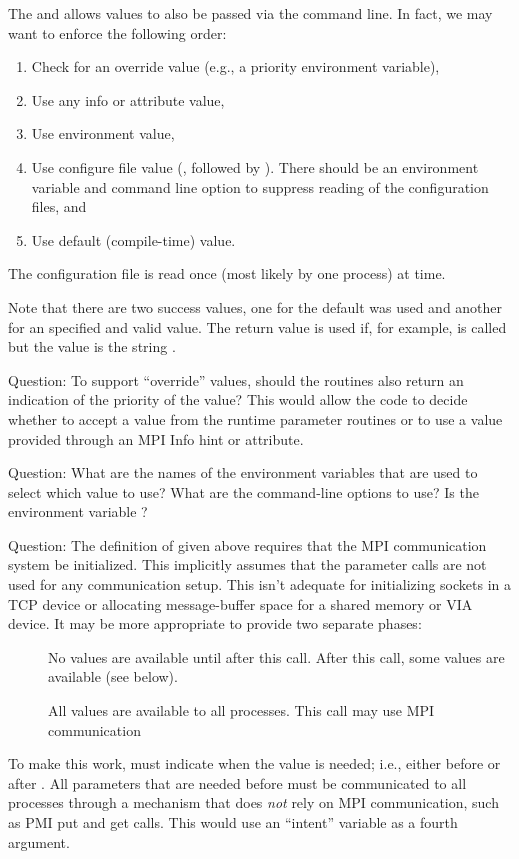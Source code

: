 \documentclass{article}
\begin{document}
The  and  allows
values to also be passed via the command line.  
In fact, we may want to enforce the following order:
\begin{enumerate}
\item Check for an override value (e.g., a priority environment variable),
\item Use any info or attribute value,
\item Use environment value,
\item Use configure file value (, followed by
  ).  There should be an environment variable and command
  line option to suppress reading of the configuration files, and
\item Use default (compile-time) value.
\end{enumerate}
The configuration file is read once (most likely by one process) at
 time.  

Note that there are two success values, one for the default was used
and another for an specified and valid value.  The return value
 is used 
if, for example,  is called but the value
is the string .

Question: To support ``override'' values, should the routines also
return an indication of the priority of the value?  This would allow
the code to decide whether to accept a value from the runtime
parameter routines or to use a value provided through an MPI Info hint
or attribute.

Question: What are the names of the environment variables that are
used to select which value to use?  What are the command-line options
to use?  Is the environment variable ?

Question: The definition of  given above
requires that the MPI communication system be initialized.  This
implicitly assumes that the parameter calls are not used for any
communication setup.  This isn't adequate for initializing sockets in
a TCP device or allocating message-buffer space for a shared memory or
VIA device.  It may be more appropriate to provide two separate
phases:
\begin{description}
\item[]No values are available until after this call.  
After this call, some values are available (see below).
\item[]All values are available to all processes.  This 
call may use MPI communication
\end{description}
To make this work,  must indicate when the
value is needed; i.e., either before or after
.  All parameters that are needed before
 must be communicated to all processes through
a mechanism that does \emph{not} rely on MPI communication, such as
PMI put and get calls.  This would use an ``intent'' variable as a
fourth argument.
\end{document}
